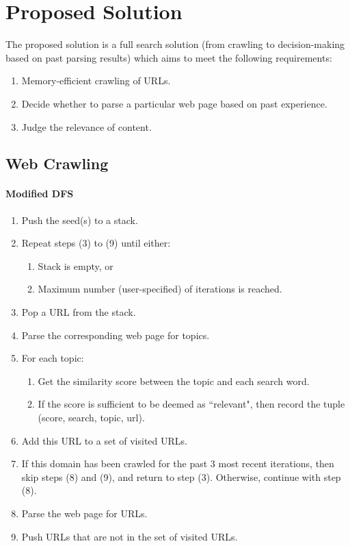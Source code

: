 \documentclass{article}
\begin{document}
\section{Proposed Solution}
\label{sec:5}
\begin{comment}
(Propose a method to solve the problem stated in \hyperref[sec:1]{Section 1 Introduction}.)
\end{comment}

The proposed solution is a full search solution (from crawling to decision-making based on past parsing results) which aims to meet the following requirements:
\begin{enumerate}
	\item Memory-efficient crawling of URLs.
	\item Decide whether to parse a particular web page based on past experience.
	\item Judge the relevance of content.
\end{enumerate}

\subsection{Web Crawling}

\paragraph{Modified DFS}
\begin{enumerate}
	\item Push the seed(s) to a stack.
	\item Repeat steps (3) to (9) until either:
		\begin{enumerate}
			\item Stack is empty, or
			\item Maximum number (user-specified) of iterations is reached.
		\end{enumerate}
	\item Pop a URL from the stack.
	\item Parse the corresponding web page for topics.
	\item For each topic:
	\begin{enumerate}
		\item Get the similarity score between the topic and each search word.
		\item If the score is sufficient to be deemed as ``relevant", then record the tuple (score, search, topic, url).
	\end{enumerate}
	\item Add this URL to a set of visited URLs.
	\item If this domain has been crawled for the past 3 most recent iterations, then skip steps (8) and (9), and return to step (3). Otherwise, continue with step (8).
	\item Parse the web page for URLs.
	\item Push URLs that are not in the set of visited URLs.
\end{enumerate}
\newpage
\end{document}
